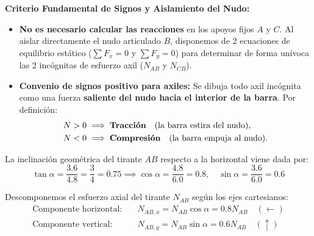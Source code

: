 {    \tcblower


    \begin{tcolorbox}[colback=blue!3!white, colframe=blue!60!black, arc=2pt, boxrule=0.6pt]
        \textbf{Criterio Fundamental de Signos y Aislamiento del Nudo:}
        \begin{itemize}
            \item \textbf{No es necesario calcular las reacciones} en los apoyos fijos $A$ y $C$. Al aislar directamente el nudo articulado $B$, disponemos de 2 ecuaciones de equilibrio estático ($\sum F_x = 0$ y $\sum F_y = 0$) para determinar de forma unívoca las 2 incógnitas de esfuerzo axil ($N_{AB}$ y $N_{CB}$).
            \item \textbf{Convenio de signos positivo para axiles:} Se dibuja todo axil incógnita como una fuerza \textbf{saliente del nudo hacia el interior de la barra}. Por definición:
                  \begin{align}
                      N > 0 &\implies \text{\textbf{Tracción}} \quad (\text{la barra estira del nudo}), \notag \\
                      N < 0 &\implies \text{\textbf{Compresión}} \quad (\text{la barra empuja al nudo}).
                  \end{align}
        \end{itemize}
    \end{tcolorbox}

    La inclinación geométrica del tirante $AB$ respecto a la horizontal viene dada por:
    \begin{equation}
        \tan \alpha = \frac{3.6}{4.8} = \frac{3}{4} = 0.75 \implies \cos \alpha = \frac{4.8}{6.0} = 0.8, \quad \sin \alpha = \frac{3.6}{6.0} = 0.6
    \end{equation}

    Descomponemos el esfuerzo axial del tirante $N_{AB}$ según los ejes cartesianos:
    \begin{align}
        \text{Componente horizontal:} & \quad N_{AB,x} = N_{AB} \cos \alpha = 0.8 N_{AB} \quad (\leftarrow) \\
        \text{Componente vertical:}   & \quad N_{AB,y} = N_{AB} \sin \alpha = 0.6 N_{AB} \quad (\uparrow)
    \end{align}

    \begin{center}
\end{center}}

